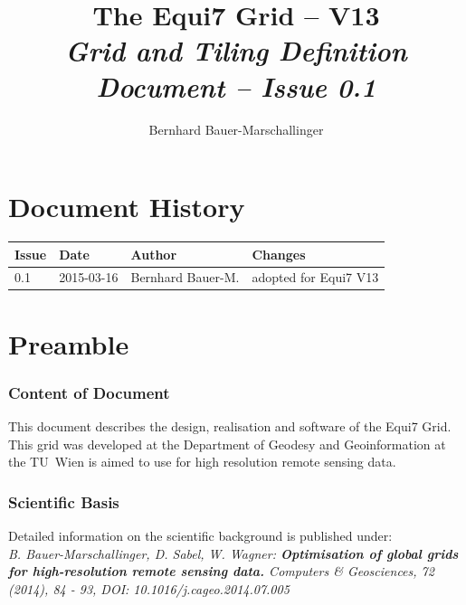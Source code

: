 \documentclass[10pt,a4paper]{article}
\begin{document}
\author{Bernhard Bauer-Marschallinger}
\title{\textbf{The Equi7 Grid -- V13} \\ \vspace{10 mm} \Large \textbf{\textit{Grid and Tiling Definition Document -- Issue 0.1}}}
\maketitle


\newpage

\parskip 4pt
\tableofcontents

\newpage

\section*{Document History}

\begin{tabular}{llll}
\hline 
\textbf{Issue} & \textbf{Date} & \textbf{Author} & \textbf{Changes} \\ 
\hline 
0.1 & 2015-03-16 & Bernhard Bauer-M. & adopted for Equi7 V13 \\ 
\hline 
\end{tabular} 

\newpage

\section{Preamble}
\label{sec:preamble}

\subsubsection*{Content of Document}
This document describes the design, realisation and software of the Equi7 Grid. This grid was developed at the Department of Geodesy and Geoinformation at the TU~Wien is aimed to use for high resolution remote sensing data. 

\subsubsection*{Scientific Basis}
Detailed information on the scientific background is published under: \\
\textit{B. Bauer-Marschallinger, D. Sabel, W. Wagner: \textbf{Optimisation of global grids for high-resolution remote sensing data.} Computers \& Geosciences, 72 (2014), 84 - 93, DOI: 10.1016/j.cageo.2014.07.005}
\end{document}
